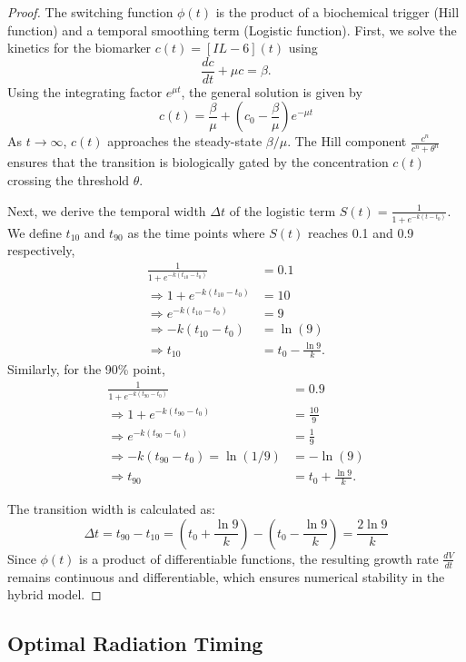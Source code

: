 \documentclass[11pt, reqno]{amsart}
\numberwithin{equation}{section}
\theoremstyle{definition}
\begin{document}
\begin{proof}
The switching function $\phi(t)$ is the product of a biochemical trigger (Hill function) and a temporal smoothing term (Logistic function). First, we solve the kinetics for the biomarker $c(t) = [IL-6](t)$ using
\[ \frac{dc}{dt} + \mu c = \beta .\]
Using the integrating factor $e^{\mu t}$, the general solution is given by
\[ c(t) = \frac{\beta}{\mu} + \left( c_0 - \frac{\beta}{\mu} \right) e^{-\mu t} \]
As $t \to \infty$, $c(t)$ approaches the steady-state $\beta/\mu$. The Hill component $\frac{c^n}{c^n + \theta^n}$ ensures that the transition is biologically gated by the concentration $c(t)$ crossing the threshold $\theta$.

Next, we derive the temporal width $\Delta t$ of the logistic term $S(t) = \frac{1}{1 + e^{-k(t-t_0)}}$. We define $t_{10}$ and $t_{90}$ as the time points where $S(t)$ reaches 0.1 and 0.9 respectively,
\begin{align*}
\frac{1}{1 + e^{-k(t_{10}-t_0)}} &= 0.1\\ 
\Rightarrow 1 + e^{-k(t_{10}-t_0)} &= 10 \\
\Rightarrow e^{-k(t_{10}-t_0)} &= 9 \\
\Rightarrow -k(t_{10}-t_0) &= \ln(9)\\ 
\Rightarrow t_{10} &= t_0 - \frac{\ln 9}{k}.
\end{align*}
Similarly, for the 90\% point,
\begin{align*}
\frac{1}{1 + e^{-k(t_{90}-t_0)}} &= 0.9 \\
\Rightarrow 1 + e^{-k(t_{90}-t_0)} &= \frac{10}{9} \\
\Rightarrow e^{-k(t_{90}-t_0)} &= \frac{1}{9} \\
\Rightarrow -k(t_{90}-t_0) = \ln(1/9) &= -\ln(9)\\
\Rightarrow t_{90} &= t_0 + \frac{\ln 9}{k}.
\end{align*}

The transition width is calculated as:
\[ \Delta t = t_{90} - t_{10} = \left( t_0 + \frac{\ln 9}{k} \right) - \left( t_0 - \frac{\ln 9}{k} \right) = \frac{2\ln 9}{k} \]
Since $\phi(t)$ is a product of differentiable functions, the resulting growth rate $\frac{dV}{dt}$ remains continuous and differentiable, which ensures numerical stability in the hybrid model.
\end{proof}



\subsection{Optimal Radiation Timing}
\end{document}
